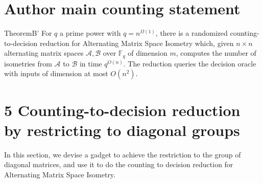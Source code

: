 \section*{Author main counting statement}
\begin{authorclaim}{TheoremB'}
For $q$ a prime power with $q=n^{\Omega(1)}$, there is a randomized counting-to-decision reduction for Alternating Matrix Space Isometry which, given $n\times n$ alternating matrix spaces $\mathcal A,\mathcal B$ over $\mathbb F_q$ of dimension $m$, computes the number of isometries from $\mathcal A$ to $\mathcal B$ in time $q^{O(n)}$. The reduction queries the decision oracle with inputs of dimension at most $O(n^2)$.
\end{authorclaim}
\section*{5 Counting-to-decision reduction by restricting to diagonal groups}
In this section, we devise a gadget to achieve the restriction to the group of diagonal matrices, and use it to do the counting to decision reduction for Alternating Matrix Space Isometry.
